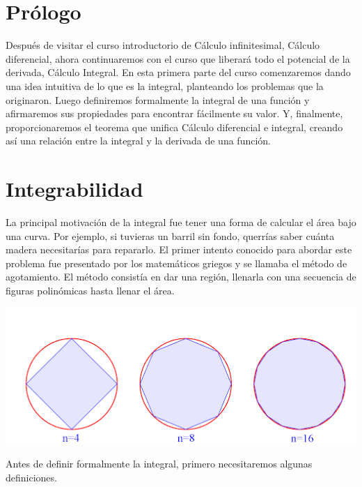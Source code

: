 \documentclass{report}
\begin{document}
    \tableofcontents

    \chapter*{Prólogo}
    Después de visitar el curso introductorio de Cálculo infinitesimal, Cálculo diferencial, ahora continuaremos con el curso que liberará todo el potencial de la derivada, Cálculo Integral. En esta primera parte del curso comenzaremos dando una idea intuitiva de lo que es la integral, planteando los problemas que la originaron. Luego definiremos formalmente la integral de una función y afirmaremos sus propiedades para encontrar fácilmente su valor. Y, finalmente, proporcionaremos el teorema que unifica Cálculo diferencial e integral, creando así una relación entre la integral y la derivada de una función.

    \pagebreak
    \chapter{Integrabilidad}
    La principal motivación de la integral fue tener una forma de calcular el área bajo una curva. Por ejemplo, si tuvieras un barril sin fondo, querrías saber cuánta madera necesitarías para repararlo. El primer intento conocido para abordar este problema fue presentado por los matemáticos griegos y se llamaba el método de agotamiento. El método consistía en dar una región, llenarla con una secuencia de figuras polinómicas hasta llenar el área.

    \begin{Figure}
        \begin{center}
        \includegraphics[width=1\textwidth]{images/exhaustion.png}
        \end{center}
    \end{Figure}

    Antes de definir formalmente la integral, primero necesitaremos algunas definiciones.
\end{document}
